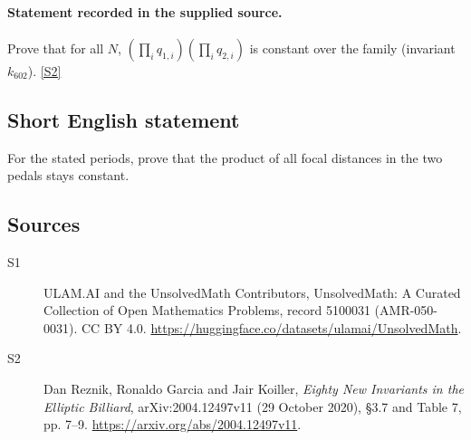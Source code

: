 \documentclass[11pt]{article}
\newcommand{\sref}[2]{\hyperlink{source:#1:#2}{[S#2]}}
\begin{document}
\paragraph{Statement recorded in the supplied source.}
Prove that for all $N$, $(\prod_iq_{1,i})(\prod_iq_{2,i})$ is constant over the family (invariant $k_{602}$). \sref{5100031}{2}
\subsection{Short English statement}
For the stated periods, prove that the product of all focal distances in the two pedals stays constant.
\subsection{Sources}
\begin{description}
\item[\hypertarget{source:5100031:1}{S1}] ULAM.AI and the UnsolvedMath Contributors, UnsolvedMath: A Curated Collection of Open Mathematics Problems, record 5100031 (AMR-050-0031). CC BY 4.0. \url{https://huggingface.co/datasets/ulamai/UnsolvedMath}.
\item[\hypertarget{source:5100031:2}{S2}] Dan Reznik, Ronaldo Garcia and Jair Koiller, \emph{Eighty New Invariants in the Elliptic Billiard}, arXiv:2004.12497v11 (29 October 2020), \S3.7 and Table 7, pp. 7--9. \url{https://arxiv.org/abs/2004.12497v11}.
\end{description}
\label{end:5100031}
\end{document}
